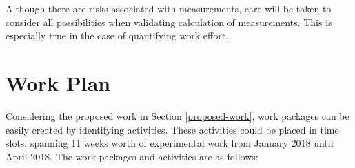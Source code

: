 \documentclass{mprop}
\begin{document}
Although there are risks associated with measurements, care will be taken to
consider all possibilities when validating calculation of measurements. This is
especially true in the case of quantifying work effort.

\section{Work Plan}
\label{work-plan}

Considering the proposed work in Section \ref{proposed-work}, work packages can
be easily created by identifying activities. These activities could be placed in
time slots, spanning 11 weeks worth of experimental work from January 2018 until
April 2018. The work packages and activities are as follows:
\end{document}
